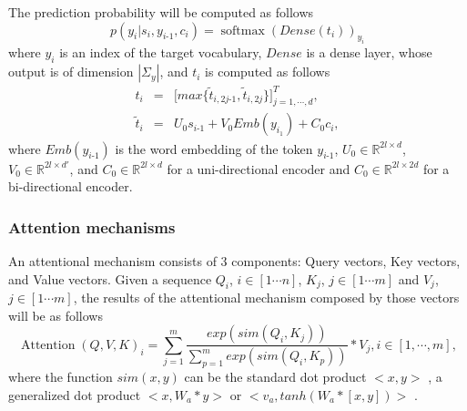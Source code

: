 The prediction probability will be computed as follows
\begin{equation}
p(y_i|s_i,y_{i\text{-}1},c_i) = \operatorname{softmax}(Dense(t_i))_{y_i}
\end{equation}
where $y_i$ is an index of the target vocabulary, $Dense$ is a dense layer, whose output is of dimension $|\Sigma_y|$, and $t_i$ is computed as follows
\begin{equation}
\begin{array}{rcl}
t_i &=& \big[ max\big\{ \tilde{t}_{i,2j\text{-}1}, \tilde{t}_{i,2j} \big\} \big]^{T}_{j=1,\cdots,d}, \\
\tilde{t}_i &=& U_0 s_{i\text{-}1} + V_0Emb(y_{i_1}) + C_0c_i,
\end{array}
\end{equation}
where $Emb(y_{i\text{-}1})$ is the word embedding of the token $y_{i\text{-}1}$, $U_0 \in \mathbb{R}^{2l\times d}$, $V_0 \in \mathbb{R}^{2l\times d'}$, and $C_0 \in \mathbb{R}^{2l\times d}$ for a uni-directional encoder and $C_0 \in \mathbb{R}^{2l\times 2d}$ for a bi-directional encoder.
\subsubsection{Attention mechanisms \label{ssec:attention}}
An attentional mechanism consists of 3 components: Query vectors, Key vectors, and Value vectors. Given a sequence $Q_i$, $i \in [1 \cdots n]$, $K_j$, $j \in [1 \cdots m]$ and $V_j$, $j \in [1 \cdots m]$, the results
of the attentional mechanism composed by those vectors will be as follows
\begin{equation}
\operatorname{Attention}(Q,V,K)_i = \displaystyle{\mathop{\sum}_{j=1}^{m}} \frac{exp(sim(Q_i,K_j))}{\displaystyle{\mathop{\sum}_{p=1}^{m}}exp(sim(Q_i,K_p))}*V_j, i \in [1, \cdots, m],
\end{equation}
where the function $sim(x,y)$ can be the standard dot product $<x,y>$ \citep{Vaswani17attention}, a generalized dot product $<x,W_a*y>$ or $<v_a, tanh(W_a*[x,y])>$ \citep{Luong15stanford, Bahdanau15learning}.

